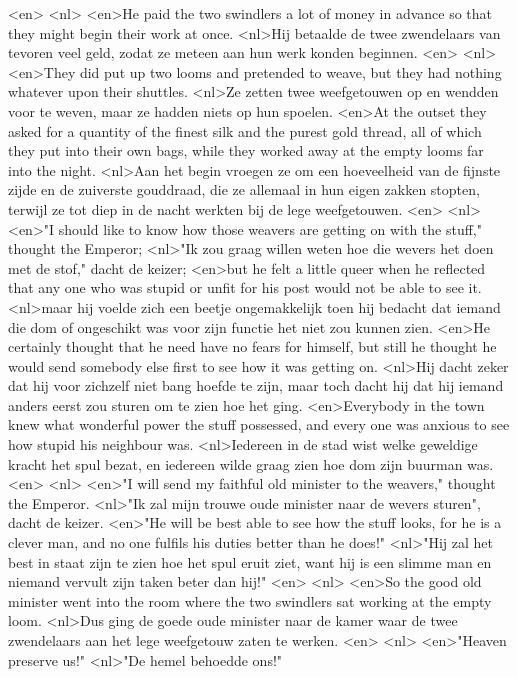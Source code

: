 <en>
<nl>
<en>He paid the two swindlers a lot of money in advance so that they might begin their work at once.
<nl>Hij betaalde de twee zwendelaars van tevoren veel geld, zodat ze meteen aan hun werk konden beginnen.
<en>
<nl>
<en>They did put up two looms and pretended to weave, but they had nothing whatever upon their shuttles.
<nl>Ze zetten twee weefgetouwen op en wendden voor te weven, maar ze hadden niets op hun spoelen.
<en>At the outset they asked for a quantity of the finest silk and the purest gold thread, all of which they put into their own bags, while they worked away at the empty looms far into the night.
<nl>Aan het begin vroegen ze om een hoeveelheid van de fijnste zijde en de zuiverste gouddraad, die ze allemaal in hun eigen zakken stopten, terwijl ze tot diep in de nacht werkten bij de lege weefgetouwen.
<en>
<nl>
<en>"I should like to know how those weavers are getting on with the stuff," thought the Emperor;
<nl>"Ik zou graag willen weten hoe die wevers het doen met de stof," dacht de keizer;
<en>but he felt a little queer when he reflected that any one who was stupid or unfit for his post would not be able to see it.
<nl>maar hij voelde zich een beetje ongemakkelijk toen hij bedacht dat iemand die dom of ongeschikt was voor zijn functie het niet zou kunnen zien.
<en>He certainly thought that he need have no fears for himself, but still he thought he would send somebody else first to see how it was getting on.
<nl>Hij dacht zeker dat hij  voor zichzelf niet bang hoefde te zijn, maar toch dacht hij dat hij iemand anders eerst zou sturen om te zien hoe het ging.
<en>Everybody in the town knew what wonderful power the stuff possessed, and every one was anxious to see how stupid his neighbour was.
<nl>Iedereen in de stad wist welke geweldige kracht het spul bezat, en iedereen wilde graag zien hoe dom zijn buurman was.
<en>
<nl>
<en>"I will send my faithful old minister to the weavers," thought the Emperor.
<nl>"Ik zal mijn trouwe oude minister naar de wevers sturen", dacht de keizer.
<en>"He will be best able to see how the stuff looks, for he is a clever man, and no one fulfils his duties better than he does!"
<nl>"Hij zal het best in staat zijn te zien hoe het spul eruit ziet, want hij is een slimme man en niemand vervult zijn taken beter dan hij!"
<en>
<nl>
<en>So the good old minister went into the room where the two swindlers sat working at the empty loom.
<nl>Dus ging de goede oude minister naar de kamer waar de twee zwendelaars aan het lege weefgetouw zaten te werken.
<en>
<nl>
<en>"Heaven preserve us!"
<nl>"De hemel behoedde ons!"
